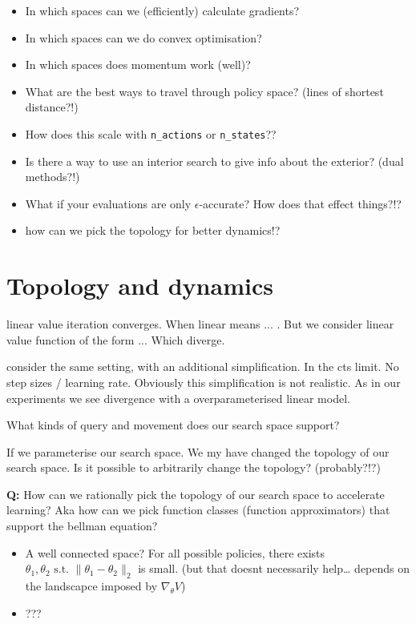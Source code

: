 \begin{itemize}
\tightlist
\item In which spaces can we (efficiently) calculate gradients?
\item In which spaces can we do convex optimisation?
\item In which spaces does momentum work (well)?
\end{itemize}


\begin{itemize}
\tightlist
\item
  What are the best ways to travel through policy space? (lines of
  shortest distance?!)
\item
  How does this scale with \texttt{n\_actions} or \texttt{n\_states}??
\item
  Is there a way to use an interior search to give info about the
  exterior? (dual methods?!)
\item
  What if your evaluations are only \(\epsilon\)-accurate? How does that
  effect things?!?
\item
  how can we pick the topology for better dynamics!?
\end{itemize}

\section{Topology and dynamics}

\cite{Tsitsiklis2000} linear value iteration converges. When linear means ... . But we consider linear value function of the form ...
Which diverge.

\cite{Brandfonbrener2019} consider the same setting, with an additional simplification. In the cts limit. No step sizes / learning rate.
Obviously this simplification is not realistic. As in our experiments we see divergence with a overparameterised linear model.

What kinds of query and movement does our search space support?

If we parameterise our search space. We my have changed the topology of our search space.
Is it possible to arbitrarily change the topology? (probably?!?)

\textbf{Q:} How can we rationally pick the topology of our search space
to accelerate learning?
Aka how can we pick function classes (function approximators) that support the bellman equation?

\begin{itemize}
\item
  A well connected space? For all possible policies, there exists
  \(\theta_1, \theta_2 \text{ s.t. } \parallel \theta_1- \theta_2\parallel_2\)
  is small. (but that doesnt necessarily help\ldots{} depends on the
  landscapce imposed by \(\nabla_{\theta} V\))
\item
  ???
\end{itemize}

